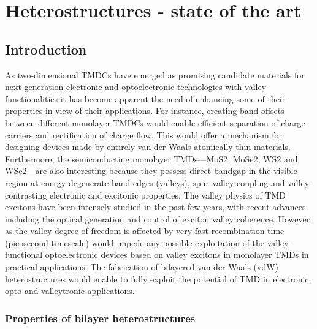 \section{Heterostructures - state of the art}

\subsection{Introduction}

As two-dimensional TMDCs have emerged as promising candidate materials for next-generation electronic and optoelectronic technologies with valley functionalities it has become apparent the need of enhancing some of their properties in view of their applications. For instance, creating band offsets between different monolayer TMDCs would enable efficient separation of charge carriers and rectification of charge flow. This would offer a mechanism for designing devices made by entirely van der Waals atomically thin materials.  Furthermore, the semiconducting monolayer TMDs—MoS2, MoSe2, WS2 and WSe2—are also interesting because they possess direct bandgap in the visible region at energy degenerate band edges (valleys), spin–valley coupling and valley-contrasting electronic and excitonic properties.
 The valley physics of TMD excitons have been intensely studied in the past few years, with recent advances including the optical generation and control of exciton valley coherence. However, as the valley degree of freedom is affected by very fast recombination time (picosecond timescale) would impede any possible exploitation of the valley-functional optoelectronic devices based on valley excitons in monolayer TMDs in practical applications. The fabrication of bilayered van der Waals (vdW) heterostructures would enable to fully exploit the potential of TMD in electronic, opto and valleytronic applications.

\subsubsection{Properties of bilayer heterostructures}

